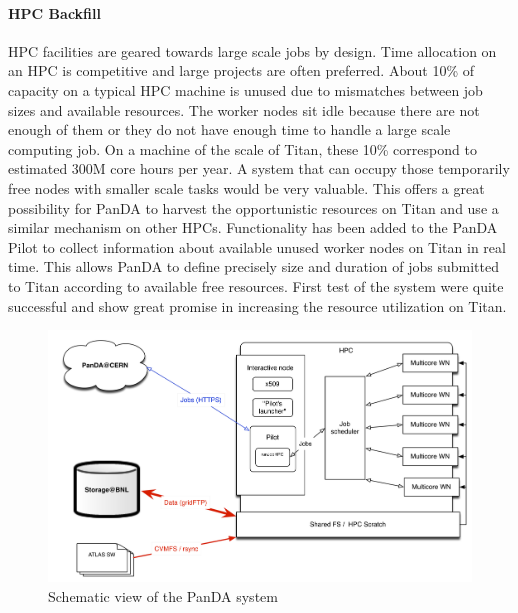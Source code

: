 \paragraph*{HPC Backfill} HPC facilities are geared towards  large scale jobs by
design. Time allocation on an HPC is competitive and large projects are often
preferred. About 10\% of capacity on a  typical HPC machine  is unused  due to
mismatches between job sizes and available  resources. The worker nodes sit idle
because there are not enough of them or they do not have enough time to handle a
large scale computing job. On a machine of the scale of Titan, these 10\%
correspond to estimated 300M core hours per year. A system that can occupy those
temporarily free nodes with smaller scale tasks would be very valuable. This
offers a great possibility for PanDA to harvest the opportunistic resources on
Titan and use a similar mechanism on other HPCs. Functionality has been added to
the PanDA Pilot to collect information about available unused worker nodes on
Titan in real time. This allows PanDA to define precisely size and duration of
jobs submitted to Titan according to available free resources. First test of the
system were quite successful and show great promise in increasing the resource
utilization on Titan.

\begin{figure}
\begin{center}
\includegraphics[width=\columnwidth]{figures/PandaInterfaceWithHPC.png}
\caption{Schematic view of the PanDA system\label{fig:interface}}
\end{center}
\end{figure}

